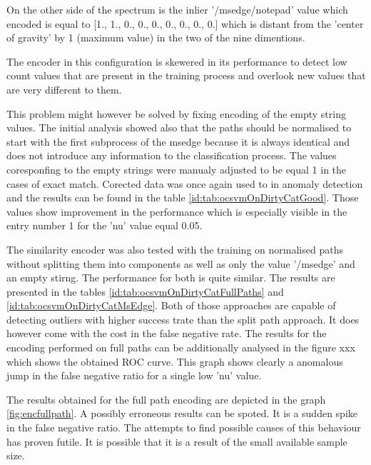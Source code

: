 \documentclass[a4paper,twoside,12pt]{book}
\begin{document}
On the other side of the spectrum is the inlier '/msedge/notepad' value which encoded is equal to
[1., 1., 0., 0., 0., 0., 0., 0., 0.] which is distant from the 'center of gravity' by 1 (maximum 
value) in the two of the nine dimentions. 

The encoder in this configuration is skewered in its performance to detect low count values that
are present in the training process and overlook new values that are very different to them. 

This problem might however be solved by fixing encoding of the empty string values. The
initial analysis showed also that the paths should be normalised to start with the first 
subprocess of the msedge because it is always identical and does not introduce any information
to the classification process. The values coresponfing to the empty strings were manualy adjusted
to be equal 1 in the cases of exact match. Corected data was once again used to in anomaly detection
and the results can be found in the table \ref{id:tab:ocsvmOnDirtyCatGood}. Those values show 
improvement in the performance which is especially visible in the entry number 1 for the 'nu' 
value equal 0.05.

The similarity encoder was also tested with the training on normalised paths without splitting 
them into components as well as only the value '/msedge' and an empty stirng. The performance for
both is quite similar. The results are presented in the tables \ref{id:tab:ocsvmOnDirtyCatFullPaths} 
and \ref{id:tab:ocsvmOnDirtyCatMsEdge}. Both of those approaches
are capable of detecting outliers with higher success trate than the split path approach. It does
however come with the cost in the false negative rate. The results for the encoding performed on full
paths can be additionally analysed in the figure xxx which shows the obtained ROC curve. 
This graph shows clearly a anomalous jump in the false negative ratio for a single low 'nu' value.

The results obtained for the full path encoding are depicted in the graph \ref{fig:encfullpath}. A 
possibly erroneous results can be spoted. It is a sudden spike in the false negative ratio. The 
attempts to find possible causes of this behaviour has proven futile. It is possible that it is
a result of the small available sample size.
\end{document}

